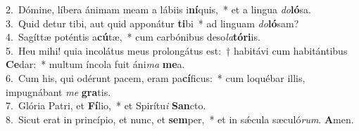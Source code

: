 {2.~}Dómine, líbera ánimam meam a lábiis i\textbf{ní}quis,~* et a lingua \textit{do}\textbf{ló}sa.\\
{3.~}Quid detur tibi, aut quid apponátur \textbf{ti}bi~* ad linguam \textit{do}\textbf{ló}sam?\\
{4.~}Sagíttæ poténtis a\textbf{cú}tæ,~* cum carbónibus deso\textit{la}\textbf{tó}\textbf{ri}is.\\
{5.~}Heu mihi! quia incolátus meus prolongátus est:~† habitávi cum habitántibus \textbf{Ce}dar:~* multum íncola fuit áni\textit{ma} \textbf{me}a.\\
{6.~}Cum his, qui odérunt pacem, eram pa\textbf{cí}ficus:~* cum loquébar illis, impugnábant \textit{me} \textbf{gra}tis.\\
{7.~}Glória Patri, et \textbf{Fí}lio,~* et Spirítu\textit{i} \textbf{San}cto.\\
{8.~}Sicut erat in princípio, et nunc, et \textbf{sem}per,~* et in sǽcula sæculó\textit{rum}. \textbf{A}men.\\
